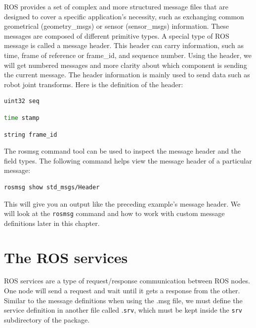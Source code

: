 \documentclass[../../main]{subfiles}
\begin{document}
ROS provides a set of complex and more structured message files that are designed to cover a specific application's necessity, such as exchanging common geometrical (geometry\_msgs) or sensor (sensor\_msgs) information. These messages are composed of different primitive types. A special type of ROS message is called a message header. This header can carry information, such as time, frame of reference or frame\_id, and sequence number. Using the header, we will get numbered messages and more clarity about which component is sending the current message. The header information is mainly used to send data such as robot joint transforms. Here is the definition of the header:
\begin{lstlisting}[language=bash, frame=shadowbox]
    uint32 seq
\end{lstlisting}
\begin{lstlisting}[language=bash, frame=shadowbox]
    time stamp
\end{lstlisting}
\begin{lstlisting}[language=bash, frame=shadowbox]
    string frame_id
\end{lstlisting}

The rosmsg command tool can be used to inspect the message header and the field types.
The following command helps view the message header of a particular message:
\begin{lstlisting}[language=bash, frame=shadowbox]
    rosmsg show std_msgs/Header
\end{lstlisting}
This will give you an output like the preceding example's message header. We will look
at the \texttt{rosmsg} command and how to work with custom message definitions later in this
chapter.
\newpage
\section{The ROS services}
ROS services are a type of request/response communication between ROS nodes. One node will send a request and wait until it gets a response from the other. Similar to the message definitions when using the .msg file, we must define the service definition in another file called .\texttt{srv}, which must be kept inside the \texttt{srv} subdirectory of the package.
\end{document}
